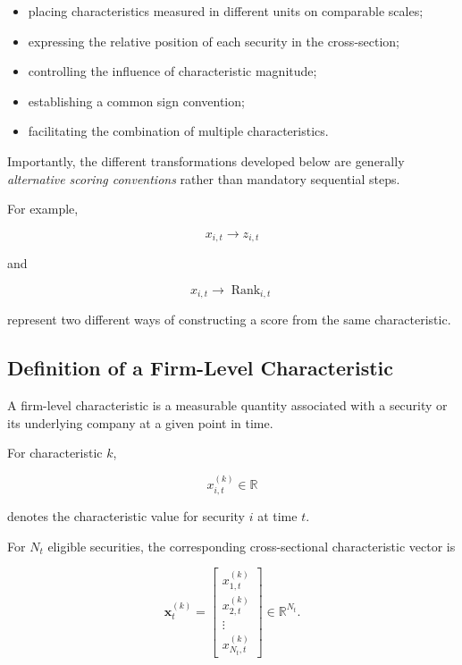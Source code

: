 \documentclass[11pt,a4paper]{article}
\begin{document}
\begin{itemize}
    \item placing characteristics measured in different units on comparable
    scales;
    \item expressing the relative position of each security in the
    cross-section;
    \item controlling the influence of characteristic magnitude;
    \item establishing a common sign convention;
    \item facilitating the combination of multiple characteristics.
\end{itemize}

Importantly, the different transformations developed below are generally
\emph{alternative scoring conventions} rather than mandatory sequential steps.

For example,

\begin{equation}
x_{i,t}
\rightarrow
z_{i,t}
\end{equation}

and

\begin{equation}
x_{i,t}
\rightarrow
\operatorname{Rank}_{i,t}
\end{equation}

represent two different ways of constructing a score from the same
characteristic.


\subsection{Definition of a Firm-Level Characteristic}
\label{subsec:firm_level_characteristic}

A firm-level characteristic is a measurable quantity associated with a
security or its underlying company at a given point in time.

For characteristic $k$,

\begin{equation}
\boxed{
x_{i,t}^{(k)}
\in
\mathbb{R}
}
\end{equation}

denotes the characteristic value for security $i$ at time $t$.

For $N_t$ eligible securities, the corresponding cross-sectional characteristic
vector is

\begin{equation}
\boxed{
\mathbf{x}_t^{(k)}
=
\begin{bmatrix}
x_{1,t}^{(k)}
\\
x_{2,t}^{(k)}
\\
\vdots
\\
x_{N_t,t}^{(k)}
\end{bmatrix}
\in
\mathbb{R}^{N_t}.
}
\end{equation}
\end{document}
